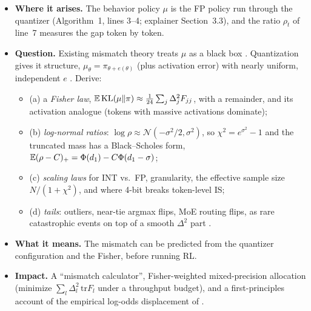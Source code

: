 \documentclass[11pt]{article}
\begin{document}
\begin{itemize}
\item \textbf{Where it arises.} The behavior policy $\mu$ is the FP policy run through the quantizer (Algorithm~1, lines 3--4; explainer Section~3.3), and the ratio $\rho_t$ of line~7 measures the gap token by token.
\item \textbf{Question.} Existing mismatch theory treats $\mu$ as a black box \citep{li2025trm,qi2026dppo,yu2026cis}. Quantization gives it structure, $\mu_\theta=\pi_{\theta+e(\theta)}$ (plus activation error) with nearly uniform, independent $e$ \citep{widrow2008quantization,sripad1977necessary}. Derive:
  \begin{itemize}
  \item (a) a \emph{Fisher law}, $\mathbb{E}\,\mathrm{KL}(\mu\|\pi)\approx\tfrac1{24}\sum_j\Delta_j^2F_{jj}$, with a remainder, and its activation analogue (tokens with massive activations dominate);
  \item (b) \emph{log-normal ratios}: $\log\rho\approx\mathcal N(-\sigma^2/2,\sigma^2)$, so $\chi^2=e^{\sigma^2}-1$ and the truncated mass has a Black--Scholes form, $\mathbb{E}(\rho-C)_+=\Phi(d_1)-C\Phi(d_1-\sigma)$;
  \item (c) \emph{scaling laws} for INT vs.\ FP, granularity, the effective sample size $N/(1+\chi^2)$, and where 4-bit breaks token-level IS;
  \item (d) \emph{tails}: outliers, near-tie argmax flips, MoE routing flips, as rare catastrophic events on top of a smooth $\Delta^2$ part \citep[cf. the error tokens of][]{gu2026qarl}.
  \end{itemize}
\item \textbf{What it means.} The mismatch can be predicted from the quantizer configuration and the Fisher, before running RL.
\item \textbf{Impact.} A ``mismatch calculator'', Fisher-weighted mixed-precision allocation (minimize $\sum_l\Delta_l^2\,\mathrm{tr}F_l$ under a throughput budget), and a first-principles account of the empirical log-odds displacement of \citet{yu2026cis}.
\end{itemize}
\end{document}
